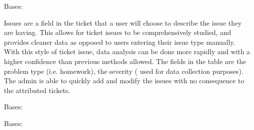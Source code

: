 \documentclass[letterpaper,10pt,english]{sphinxmanual}
\begin{document}

\begin{fulllineitems}
\label{\detokenize{models/issue:api.models.issue.Issues}}
\pysigstartsignatures
{}
\pysigstopsignatures
\sphinxAtStartPar
Bases: 

\sphinxAtStartPar
Issues are a field in the ticket that a user will choose to describe the
issue they are having. This allows for ticket issues to be comprehensively
studied, and provides cleaner data as opposed to users entering their
issue type manually. With this style of ticket issue, data analysis can be
done more rapidly and with a higher confidence than previous methods allowed.
The fields in the table are the problem type (i.e. homework), the severity (
used for data collection purposes). The admin is able to quickly add and
modify the issues with no consequence to the attributed tickets.

\begin{fulllineitems}
\label{\detokenize{models/issue:api.models.issue.Issues.DoesNotExist}}
\pysigstartsignatures
{}
\pysigstopsignatures
\sphinxAtStartPar
Bases: 

\end{fulllineitems}


\begin{fulllineitems}
\label{\detokenize{models/issue:api.models.issue.Issues.MultipleObjectsReturned}}
\pysigstartsignatures
{}
\pysigstopsignatures
\sphinxAtStartPar
Bases: 

\end{fulllineitems}



\end{fulllineitems}
\end{document}
